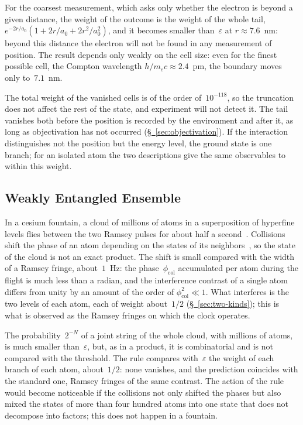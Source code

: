 \documentclass[11pt,a4paper]{article}
\begin{document}
For the coarsest measurement, which asks only whether the electron is beyond a given distance, the weight of the outcome is the weight of the whole tail, $e^{-2r/a_0}(1+2r/a_0+2r^2/a_0^2)$, and it becomes smaller than~$\varepsilon$ at $r\approx7.6$~nm: beyond this distance the electron will not be found in any measurement of position. The result depends only weakly on the cell size: even for the finest possible cell, the Compton wavelength $h/m_ec\approx2.4$~pm, the boundary moves only to~$7.1$~nm.

The total weight of the vanished cells is of the order of~$10^{-118}$, so the truncation does not affect the rest of the state, and experiment will not detect it. The tail vanishes both before the position is recorded by the environment and after it, as long as objectivation has not occurred (\hyperref[sec:objectivation]{\S~\ref*{sec:objectivation}}). If the interaction distinguishes not the position but the energy level, the ground state is one branch; for an isolated atom the two descriptions give the same observables to within this weight.

\subsection{Weakly Entangled Ensemble}
\label{sec:fountain}

In a cesium fountain, a cloud of millions of atoms in a superposition of hyperfine levels flies between the two Ramsey pulses for about half a second~\cite{wynands2005}. Collisions shift the phase of an atom depending on the states of its neighbors~\cite{gibble1993}, so the state of the cloud is not an exact product. The shift is small compared with the width of a Ramsey fringe, about~$1$~Hz: the phase~$\phi_{\mathrm{col}}$ accumulated per atom during the flight is much less than a radian, and the interference contrast of a single atom differs from unity by an amount of the order of $\phi_{\mathrm{col}}^2\ll1$. What interferes is the two levels of each atom, each of weight about~$1/2$ (\hyperref[sec:two-kinds]{\S~\ref*{sec:two-kinds}}); this is what is observed as the Ramsey fringes on which the clock operates.

The probability~$2^{-N}$ of a joint string of the whole cloud, with millions of atoms, is much smaller than~$\varepsilon$, but, as in a product, it is combinatorial and is not compared with the threshold. The rule compares with~$\varepsilon$ the weight of each branch of each atom, about~$1/2$: none vanishes, and the prediction coincides with the standard one, Ramsey fringes of the same contrast. The action of the rule would become noticeable if the collisions not only shifted the phases but also mixed the states of more than four hundred atoms into one state that does not decompose into factors; this does not happen in a fountain.
\end{document}
